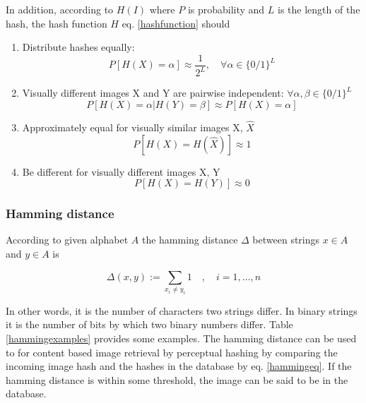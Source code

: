 \documentclass[english,12pt,a4paper,pdftex,elec,utf8]{aaltothesis}
\begin{document}
In addition, according to \cite{mihccak2001new} $H(I)$ where $P$ is probability and $L$ is the length of the hash, the hash function $H$ eq. \ref{hashfunction} should
\begin{enumerate}
\item Distribute hashes equally:\\
  \begin{equation}\label{phashdistribute}
  P[H(X)=\alpha]\approx\frac{1}{2^L},\quad\forall\alpha\in \{0/1\}^L
  \end{equation}
\item Visually different images X and Y are pairwise independent: $\forall\alpha,\beta\in\{0/1\}^L$\\
  \begin{equation}\label{phashindependent}
    P[H(X)=\alpha|H(Y)=\beta]\approx P[H(X)=\alpha]
  \end{equation}
\item Approximately equal for visually similar images X, $\hat{X}$\\
  \begin{equation}\label{phashsame}
    P[H(X) = H(\hat{X})] \approx 1
  \end{equation}

\item Be different for visually different images X, Y\\
  \begin{equation}\label{phashdif}
    P[H(X)=H(Y)]\approx 0
  \end{equation}
\end{enumerate}

\subsubsection{Hamming distance}
According to \cite{Hamming1950} given alphabet $A$ the hamming distance $\Delta$ between strings $x \in A$ and $y \in A$ is

\begin{equation}\label{hammingeq}
\Delta(x,y):=\sum_{x_i\neq y_i}1\quad,\quad i=1,\ldots,n
\end{equation}

In other words, it is the number of characters two strings differ. In binary strings it is the number of bits by which two binary numbers differ. Table \ref{hammingexamples} provides some examples. The hamming distance can be used to for content based image retrieval by perceptual hashing by comparing the incoming image hash and the hashes in the database by eq. \ref{hammingeq}. If the hamming distance is within some threshold, the image can be said to be in the database.
\end{document}

